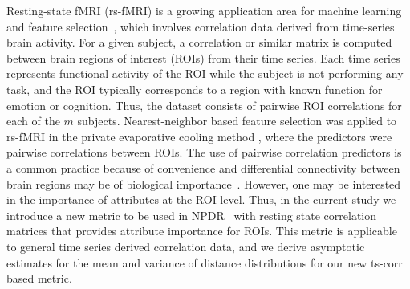 \documentclass[aos]{imsart}
\begin{document}
Resting-state fMRI (rs-fMRI) is a growing application area for machine learning and feature selection~\cite{venkataraman2010,hay2017,sundermann2014,vergun2013}, which involves correlation data derived from time-series brain activity. For a given subject, a correlation or similar matrix is computed between brain regions of interest (ROIs) from their time series. Each time series represents functional activity of the ROI while the subject is not performing any task, and the ROI typically corresponds to a region with known function for emotion or cognition. Thus, the dataset consists of pairwise ROI correlations for each of the $m$ subjects. Nearest-neighbor based feature selection was applied to rs-fMRI in the private evaporative cooling method \cite{le17}, where the predictors were pairwise correlations between ROIs. The use of pairwise correlation predictors is a common practice because of convenience and differential connectivity between brain regions may be of biological importance~\cite{gotts2012}. However, one may be interested in the importance of attributes at the ROI level. Thus, in the current study we introduce a new metric to be used in NPDR~\cite{npdr} with resting state correlation matrices that provides attribute importance for ROIs. This metric is applicable to general time series derived correlation data, and we derive asymptotic estimates for the mean and variance of distance distributions for our new ts-corr based metric.


\end{document}
